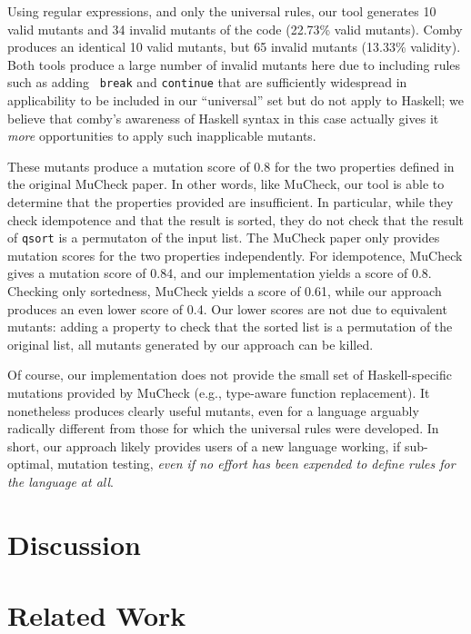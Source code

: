 \documentclass[sigconf,review, anonymous]{acmart}
\begin{document}
{Using regular expressions, and only the universal rules, our tool
generates 10 valid mutants and 34 invalid mutants of the code (22.73\%
valid mutants).  Comby produces an identical 10 valid mutants, but 65
invalid mutants (13.33\% validity).  Both tools produce a large number
of invalid mutants here due to including rules such as adding {\tt
  break} and {\tt continue} that are sufficiently widespread in
applicability to be included in our ``universal'' set but do not apply
to Haskell; we believe that comby's awareness of Haskell syntax in
this case actually gives it \emph{more} opportunities to apply such
inapplicable mutants.

These mutants produce a mutation
score of 0.8 for the two properties defined in the original MuCheck
paper.  In other words, like MuCheck, our tool is able to
determine that the properties provided are insufficient.  In
particular, while they check idempotence and that the result is
sorted, they do not check that the result of {\tt qsort} is a permutaton of the input
list.  The MuCheck paper only provides mutation scores for the two
properties independently.  For idempotence, MuCheck gives a mutation
score of 0.84, and our implementation yields a score of 0.8.  Checking
only sortedness, MuCheck yields a score of 0.61, while our approach
produces an even lower score of 0.4.  Our lower
scores are not due to equivalent mutants: adding a property to check
that the sorted list is a permutation of the original list, all
mutants generated by our approach can be killed.

Of course, our implementation does not provide the small set of Haskell-specific
mutations provided by MuCheck (e.g., type-aware function replacement).  It nonetheless produces clearly useful
mutants, even for a language arguably radically different from those
for which the universal rules were developed.  In short, our approach
likely provides users of a new language working, if sub-optimal, mutation testing,
\emph{even if no effort has been expended to define rules for the
  language at all}.

\section{Discussion}

\section{Related Work}

}
\end{document}
